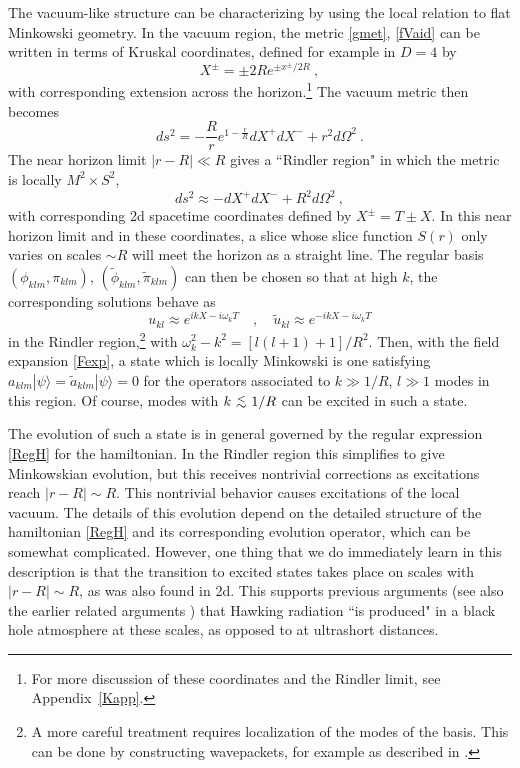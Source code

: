 \documentclass[12pt]{article}
\numberwithin{equation}{section}
\newcommand{\beq}{\begin{equation}}
\newcommand{\eeq}{\end{equation}}
\def\lesssim{~\mbox{\raisebox{-.6ex}{$\stackrel{<}{\sim}$}}~}
\begin{document}
The vacuum-like structure can be characterizing by using the local relation to flat Minkowski geometry.  In the vacuum region, the metric \eqref{gmet}, \eqref{fVaid} can be written in terms of Kruskal coordinates, defined for example  in $D=4$ by 
\beq\label{Krudef}
X^\pm = \pm 2R e^{\pm x^\pm/2R}\ ,
\eeq
with corresponding extension across the horizon.\footnote{For more discussion of these coordinates and the Rindler limit, see Appendix~\ref{Kapp}.} The vacuum metric then becomes
\beq \label{Krmet}
ds^2 = -\frac{R}{r}e^{1-\frac{r}{R}}dX^+ dX^- + r^2 d\Omega^2\ .
\eeq
The near horizon limit $|r-R|\ll R$ gives a ``Rindler region"\cite{GiLi3} in which the metric is locally $M^2 \times S^2$,
\beq\label{prodmet}
ds^2 \approx -dX^+ dX^- + R^2 d\Omega^2\ ,
\eeq
 with corresponding 2d spacetime coordinates defined by $X^\pm = T\pm X$.  In this near horizon limit and in these coordinates, a slice whose slice function $S(r)$ only varies on scales $\sim R$ will meet the horizon as a straight line.  The regular basis $(\phi_{klm},\pi_{klm})$, $(\tilde \phi_{klm},\tilde \pi_{klm})$ can then be chosen so that at high $k$, the corresponding solutions behave as
 \beq\label{KruskalModes}
 u_{kl}\approx e^{ikX-i\omega_k T}\quad , \quad \tilde u_{kl}\approx e^{-ikX-i\omega_k T}
 \eeq
 in the Rindler region,\footnote{A more careful treatment requires localization of the modes of the basis.  This can be done by constructing wavepackets, for example as described in \cite{Hawk}\cite{GiNe}\cite{SE2d}.} with $\omega_k^2-k^2=[l(l+1)+1]/R^2$.  Then, with the field expansion \eqref{Fexp}, a state which is locally Minkowski is one satisfying $a_{klm}|\psi\rangle=\tilde a_{klm}|\psi\rangle=0$ for the operators associated to $k\gg 1/R$, $l\gg 1$ modes in this region.  Of course, modes with $k\lesssim 1/R$ can be excited in such a state.
 
The evolution of such a state is in general governed by the regular expression \eqref{RegH} for the hamiltonian.  In the Rindler region this simplifies to give Minkowskian evolution, but this receives nontrivial corrections as excitations reach $|r-R|\sim R$.  This nontrivial behavior causes excitations of the local vacuum.  The details of this evolution depend on the detailed structure of the hamiltonian \eqref{RegH} and its corresponding evolution operator, which can be somewhat complicated.  However, one thing that we do immediately learn in this description is that the transition to excited states takes place on scales with $|r-R|\sim R$, as was also found in 2d\cite{SEHS,SE2d}.  This supports previous arguments\cite{SGBoltz} (see also the earlier related arguments \cite{Unru-origin,Full,Bard}) that Hawking radiation ``is produced" in a black hole atmosphere at these scales, as opposed to at ultrashort distances.  
\end{document}
